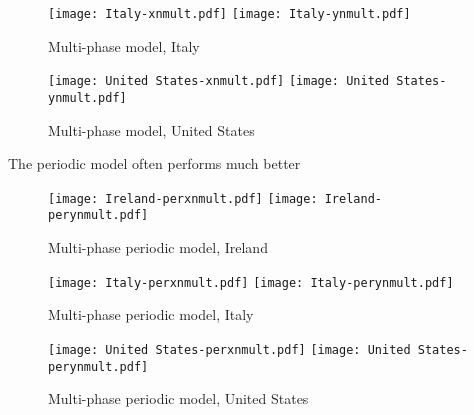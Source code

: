 \begin{figure}[H]
  \texttt{[image: Italy-xnmult.pdf]} \label{fig:italy-xnmult}
\endminipage\hfill
{}
  \texttt{[image: Italy-ynmult.pdf]} \label{fig:italy-ynmult}
\endminipage
\caption{Multi-phase model, Italy}
\end{figure}

\begin{figure}[H]
  \texttt{[image: United States-xnmult.pdf]} \label{fig:usa-xnmult}
\endminipage\hfill
{}
  \texttt{[image: United States-ynmult.pdf]} \label{fig:usa-ynmult}
\endminipage
\caption{Multi-phase model, United States}
\end{figure}


The periodic model often performs much better

\begin{figure}[H]
  \texttt{[image: Ireland-perxnmult.pdf]} \label{fig:ireland-perxnmult}
\endminipage\hfill
{}
  \texttt{[image: Ireland-perynmult.pdf]} \label{fig:ireland-perynmult}
\endminipage
\caption{Multi-phase periodic model, Ireland}
\end{figure}

\begin{figure}[H]
  \texttt{[image: Italy-perxnmult.pdf]} \label{fig:italy-perxnmult}
\endminipage\hfill
{}
  \texttt{[image: Italy-perynmult.pdf]} \label{fig:italy-perynmult}
\endminipage
\caption{Multi-phase periodic model, Italy}
\end{figure}

\begin{figure}[H]
  \texttt{[image: United States-perxnmult.pdf]} \label{fig:usa-perxnmult}
\endminipage\hfill
{}
  \texttt{[image: United States-perynmult.pdf]} \label{fig:usa-perynmult}
\endminipage
\caption{Multi-phase periodic model, United States}
\end{figure}
